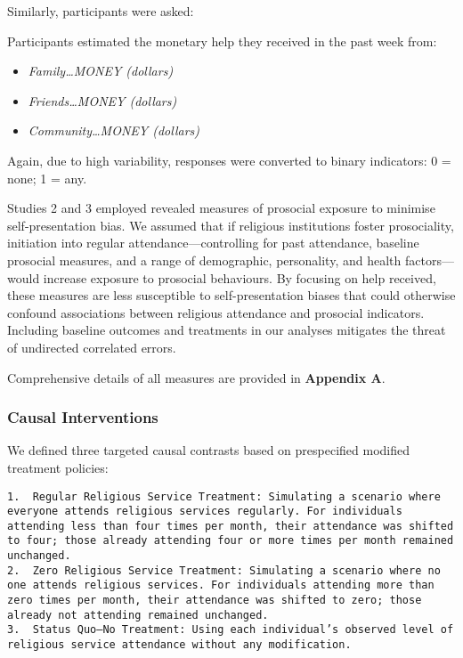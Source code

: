 \documentclass[
  single column]{article}
\providecommand{\tightlist}{%
  \setlength{\itemsep}{0pt}\setlength{\parskip}{0pt}}\usepackage{longtable,booktabs,array}
\begin{document}
Similarly, participants were asked:

Participants estimated the monetary help they received in the past week
from:

\begin{itemize}
\tightlist
\item
  \emph{Family\ldots MONEY (dollars)}
\item
  \emph{Friends\ldots MONEY (dollars)}
\item
  \emph{Community\ldots MONEY (dollars)}
\end{itemize}

Again, due to high variability, responses were converted to binary
indicators: 0 = none; 1 = any.

Studies 2 and 3 employed revealed measures of prosocial exposure to
minimise self-presentation bias. We assumed that if religious
institutions foster prosociality, initiation into regular
attendance---controlling for past attendance, baseline prosocial
measures, and a range of demographic, personality, and health
factors---would increase exposure to prosocial behaviours. By focusing
on help received, these measures are less susceptible to
self-presentation biases that could otherwise confound associations
between religious attendance and prosocial indicators. Including
baseline outcomes and treatments in our analyses mitigates the threat of
undirected correlated errors.

Comprehensive details of all measures are provided in \textbf{Appendix
A}.

\subsubsection{Causal Interventions}\label{causal-interventions}

We defined three targeted causal contrasts based on prespecified
modified treatment policies:

\begin{verbatim}
1.  Regular Religious Service Treatment: Simulating a scenario where everyone attends religious services regularly. For individuals attending less than four times per month, their attendance was shifted to four; those already attending four or more times per month remained unchanged.
2.  Zero Religious Service Treatment: Simulating a scenario where no one attends religious services. For individuals attending more than zero times per month, their attendance was shifted to zero; those already not attending remained unchanged.
3.  Status Quo—No Treatment: Using each individual’s observed level of religious service attendance without any modification.
\end{verbatim}
\end{document}
